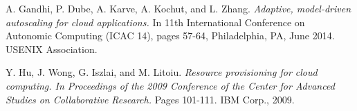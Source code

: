 \begin{thebibliography}{9}
A. Gandhi, P. Dube, A. Karve, A. Kochut, and
L. Zhang.
\textit{Adaptive, model-driven autoscaling for
cloud applications.}
In 11th International Conference
on Autonomic Computing (ICAC 14), pages 57-64,
Philadelphia, PA, June 2014. USENIX Association.

Y. Hu, J. Wong, G. Iszlai, and M. Litoiu.
\textit{Resource
provisioning for cloud computing. In Proceedings of
the 2009 Conference of the Center for Advanced
Studies on Collaborative Research.}
Pages 101-111.
IBM Corp., 2009.

\iffalse
\bibitem{asdfasfasfasfasdfasf}
Amazonsafasdfsafasfdasdf \\
asfdsadfasfsadfsa

\bibitem{asdfsadfasdfasdf}
asdfasfasfasdfasdf
\textit{asdfasdfasdfasdf}
asdfasdfasdfasdfasdfasd

\bibitem{latexcompanion} 
Michel Goossens, Frank Mittelbach, and Alexander Samarin. 
\textit{The \LaTeX\ Companion}. 
Addison-Wesley, Reading, Massachusetts, 1993.
 
\bibitem{einstein} 
Albert Einstein. 
\textit{Zur Elektrodynamik bewegter K{\"o}rper}. (German) 
[\textit{On the electrodynamics of moving bodies}]. 
Annalen der Physik, 322(10):891 921, 1905.
 
\bibitem{knuthwebsite} 
Knuth: Computers and Typesetting,
\\\texttt{http://www-cs-faculty.stanford.edu/\~{}uno/abcde.html}
\fi


\end{thebibliography}

